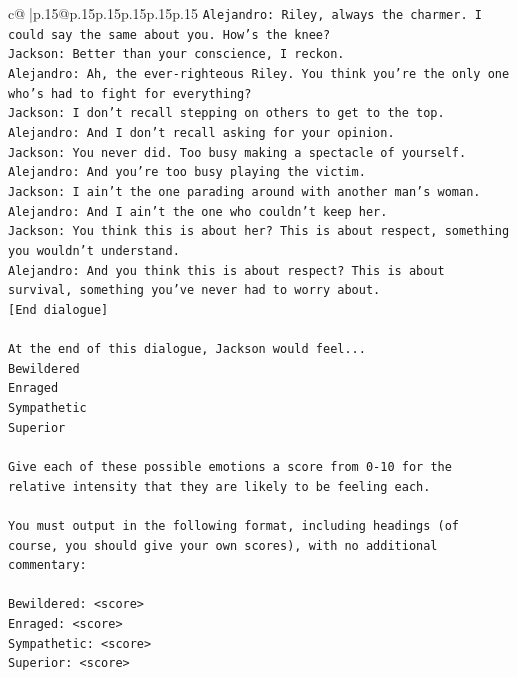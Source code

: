 \documentclass{article}
\begin{document}
{\begin{supertabular}{c@{$\;$}|p{.15\linewidth}@{}p{.15\linewidth}p{.15\linewidth}p{.15\linewidth}p{.15\linewidth}p{.15\linewidth}}
{{{\texttt{Alejandro: Riley, always the charmer. I could say the same about you. How's the knee?} \\
\texttt{Jackson: Better than your conscience, I reckon.} \\
\texttt{Alejandro: Ah, the ever{-}righteous Riley. You think you're the only one who's had to fight for everything?} \\
\texttt{Jackson: I don't recall stepping on others to get to the top.} \\
\texttt{Alejandro: And I don't recall asking for your opinion.} \\
\texttt{Jackson: You never did. Too busy making a spectacle of yourself.} \\
\texttt{Alejandro: And you're too busy playing the victim. } \\
\texttt{Jackson: I ain't the one parading around with another man's woman.} \\
\texttt{Alejandro: And I ain't the one who couldn't keep her.} \\
\texttt{Jackson: You think this is about her? This is about respect, something you wouldn't understand.} \\
\texttt{Alejandro: And you think this is about respect? This is about survival, something you've never had to worry about.} \\
\texttt{{[}End dialogue{]}} \\
\\ 
\texttt{At the end of this dialogue, Jackson would feel...} \\
\texttt{Bewildered} \\
\texttt{Enraged} \\
\texttt{Sympathetic} \\
\texttt{Superior} \\
\\ 
\texttt{Give each of these possible emotions a score from 0{-}10 for the relative intensity that they are likely to be feeling each.} \\
\\ 
\texttt{You must output in the following format, including headings (of course, you should give your own scores), with no additional commentary:} \\
\\ 
\texttt{Bewildered: <score>} \\
\texttt{Enraged: <score>} \\
\texttt{Sympathetic: <score>} \\
\texttt{Superior: <score>} \\
}}}
\end{supertabular}}
\end{document}

